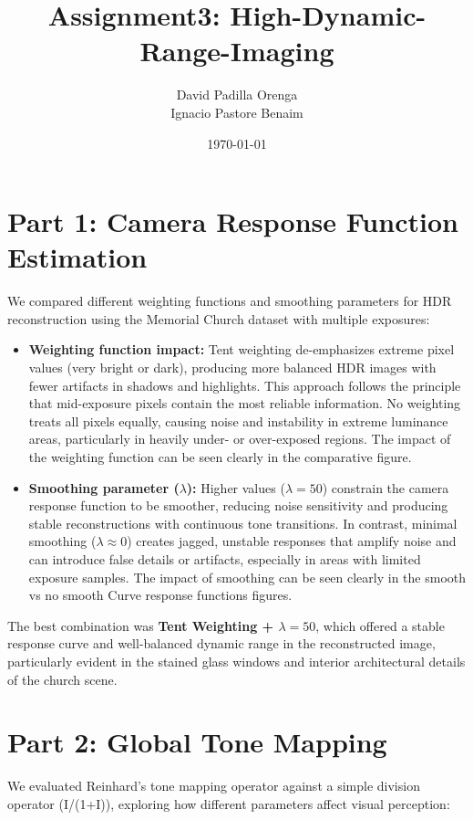 \documentclass[a4paper,10pt]{article}
\title{Assignment3: High-Dynamic-Range-Imaging}
\author{David Padilla Orenga \\ Ignacio Pastore Benaim}
\date{\today}
\begin{document}
\maketitle
\thispagestyle{empty}

\section{Part 1: Camera Response Function Estimation}
We compared different weighting functions and smoothing parameters for HDR reconstruction using the Memorial Church dataset with multiple exposures:

\begin{itemize}
    \item \textbf{Weighting function impact:} Tent weighting de-emphasizes extreme pixel values (very bright or dark), producing more balanced HDR images with fewer artifacts in shadows and highlights. This approach follows the principle that mid-exposure pixels contain the most reliable information. No weighting treats all pixels equally, causing noise and instability in extreme luminance areas, particularly in heavily under- or over-exposed regions. The impact of the weighting function can be seen clearly in the comparative figure.
    
    \item \textbf{Smoothing parameter (\(\lambda\)):} Higher values (\(\lambda=50\)) constrain 
        the camera response function to be smoother, reducing noise sensitivity and producing stable
        reconstructions with continuous tone transitions. In contrast, minimal smoothing (\(\lambda \approx 0\)) creates jagged, 
        unstable responses that amplify noise and can introduce false details or artifacts,
        especially in areas with limited exposure samples. The impact of smoothing can be seen clearly in the smooth vs no smooth Curve response functions figures.
\end{itemize}

The best combination was \textbf{Tent Weighting + \(\lambda=50\)}, which offered a stable response curve and well-balanced dynamic range in the reconstructed image, particularly evident in the stained glass windows and interior architectural details of the church scene.

\section{Part 2: Global Tone Mapping}
We evaluated Reinhard's tone mapping operator against a simple division operator (I/(1+I)), exploring how different parameters affect visual perception:
\end{document}

